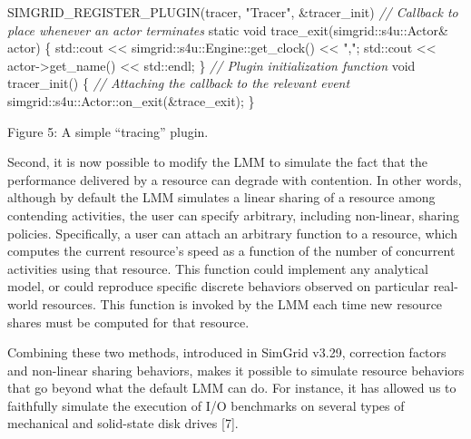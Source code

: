 \documentclass[
]{article}
\newenvironment{Shaded}{}{}
\newcommand{\AttributeTok}[1]{\textcolor[rgb]{0.49,0.56,0.16}{#1}}
\newcommand{\BuiltInTok}[1]{\textcolor[rgb]{0.00,0.50,0.00}{#1}}
\newcommand{\CommentTok}[1]{\textcolor[rgb]{0.38,0.63,0.69}{\textit{#1}}}
\newcommand{\DataTypeTok}[1]{\textcolor[rgb]{0.56,0.13,0.00}{#1}}
\newcommand{\NormalTok}[1]{#1}
\newcommand{\OperatorTok}[1]{\textcolor[rgb]{0.40,0.40,0.40}{#1}}
\newcommand{\StringTok}[1]{\textcolor[rgb]{0.25,0.44,0.63}{#1}}
\begin{document}
\begin{Shaded}
\begin{Highlighting}[]
\NormalTok{SIMGRID\_REGISTER\_PLUGIN}\OperatorTok{(}\NormalTok{tracer}\OperatorTok{,} \StringTok{"Tracer"}\OperatorTok{,} \OperatorTok{\&}\NormalTok{tracer\_init}\OperatorTok{)}
\CommentTok{// Callback to place whenever an actor terminates}
\AttributeTok{static} \DataTypeTok{void}\NormalTok{ trace\_exit}\OperatorTok{(}\NormalTok{simgrid}\OperatorTok{::}\NormalTok{s4u}\OperatorTok{::}\NormalTok{Actor}\OperatorTok{\&}\NormalTok{ actor}\OperatorTok{)} \OperatorTok{\{}
    \BuiltInTok{std::}\NormalTok{cout }\OperatorTok{\textless{}\textless{}}\NormalTok{ simgrid}\OperatorTok{::}\NormalTok{s4u}\OperatorTok{::}\NormalTok{Engine}\OperatorTok{::}\NormalTok{get\_clock}\OperatorTok{()} \OperatorTok{\textless{}\textless{}} \StringTok{","}\OperatorTok{;}
    \BuiltInTok{std::}\NormalTok{cout }\OperatorTok{\textless{}\textless{}}\NormalTok{ actor}\OperatorTok{{-}\textgreater{}}\NormalTok{get\_name}\OperatorTok{()} \OperatorTok{\textless{}\textless{}} \BuiltInTok{std::}\NormalTok{endl}\OperatorTok{;}
\OperatorTok{\}}
\CommentTok{// Plugin initialization function}
\DataTypeTok{void}\NormalTok{ tracer\_init}\OperatorTok{()} \OperatorTok{\{}
    \CommentTok{// Attaching the callback to the relevant event}
\NormalTok{    simgrid}\OperatorTok{::}\NormalTok{s4u}\OperatorTok{::}\NormalTok{Actor}\OperatorTok{::}\NormalTok{on\_exit}\OperatorTok{(\&}\NormalTok{trace\_exit}\OperatorTok{);}
\OperatorTok{\}} 
\end{Highlighting}
\end{Shaded}

Figure 5: A simple ``tracing'' plugin.

Second, it is now possible to modify the LMM to simulate the fact that
the performance delivered by a resource can degrade with contention. In
other words, although by default the LMM simulates a linear sharing of a
resource among contending activities, the user can specify arbitrary,
including non-linear, sharing policies. Specifically, a user can attach
an arbitrary function to a resource, which computes the current
resource's speed as a function of the number of concurrent activities
using that resource. This function could implement any analytical model,
or could reproduce specific discrete behaviors observed on particular
real-world resources. This function is invoked by the LMM each time new
resource shares must be computed for that resource.

Combining these two methods, introduced in SimGrid v3.29, correction
factors and non-linear sharing behaviors, makes it possible to simulate
resource behaviors that go beyond what the default LMM can do. For
instance, it has allowed us to faithfully simulate the execution of I/O
benchmarks on several types of mechanical and solid-state disk drives
{[}7{]}.
\end{document}
